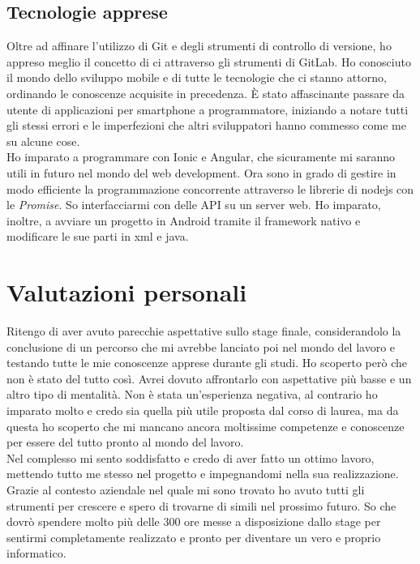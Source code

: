 \subsection{Tecnologie apprese}
Oltre ad affinare l'utilizzo di Git e degli strumenti di controllo di versione, ho appreso meglio il concetto di \gls{ci}
attraverso gli strumenti di GitLab. Ho conosciuto il mondo dello sviluppo mobile e di tutte le tecnologie che ci stanno attorno, ordinando
le conoscenze acquisite in precedenza. È stato affascinante passare da utente di applicazioni per smartphone a programmatore, iniziando a
notare tutti gli stessi errori e le imperfezioni che altri sviluppatori hanno commesso come me su alcune cose. \\
\noindent Ho imparato a programmare con Ionic e Angular, che sicuramente mi saranno utili in futuro nel mondo del web development. Ora sono
in grado di gestire in modo efficiente la programmazione concorrente attraverso le librerie di \gls{nodejs} con le \textit{Promise}. So
interfacciarmi con delle API su un server web. Ho imparato, inoltre, a avviare un progetto in Android tramite il framework nativo e
modificare le sue parti in \gls{xml} e \gls{java}.

\section{Valutazioni personali}
Ritengo di aver avuto parecchie aspettative sullo stage finale, considerandolo la conclusione di un percorso che mi avrebbe lanciato poi nel
mondo del lavoro e testando tutte le mie conoscenze apprese durante gli studi. Ho scoperto però che non è stato del tutto così. Avrei dovuto
affrontarlo con aspettative più basse e un altro tipo di mentalità. Non è stata un'esperienza negativa, al contrario ho imparato molto e
credo sia quella più utile proposta dal corso di laurea, ma da questa ho scoperto che mi mancano ancora moltissime competenze e conoscenze
per essere del tutto pronto al mondo del lavoro. \\
\noindent Nel complesso mi sento soddisfatto e credo di aver fatto un ottimo lavoro, mettendo tutto me stesso nel progetto e impegnandomi
nella sua realizzazione. Grazie al contesto aziendale nel quale mi sono trovato ho avuto tutti gli strumenti per crescere e spero di
trovarne di simili nel prossimo futuro. So che dovrò spendere molto più delle 300 ore messe a disposizione dallo stage per sentirmi
completamente realizzato e pronto per diventare un vero e proprio informatico.